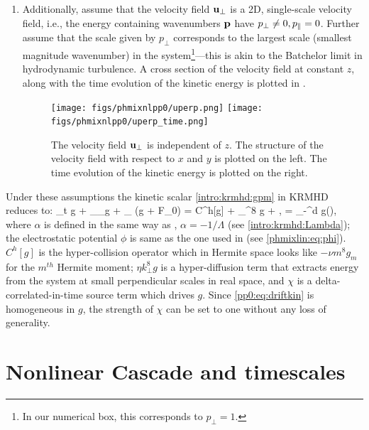 \begin{enumerate}
        \item Additionally, assume that the velocity field $\mathbf{u}_\perp$ is a 2D, single-scale velocity
        field, i.e., the energy containing wavenumbers $\mathbf{p}$ have $p_\perp\neq0,
        p_\parallel=0$.  Further assume that the scale given by $p_\perp$ corresponds to the
        largest scale (smallest magnitude wavenumber) in the system\footnote{In our
        numerical box, this corresponds to $p_\perp=1$.}---this is akin to the Batchelor limit
        \cite{batchelor59} in
        hydrodynamic turbulence. A cross section of the velocity field at constant $z$,
        along with the time evolution of the kinetic energy is plotted in
        .
    \begin{figure}
    \begin{center}
        \texttt{[image: figs/phmixnlpp0/uperp.png]}
        \texttt{[image: figs/phmixnlpp0/uperp\_time.png]}
        \caption{The velocity field $\mathbf{u}_\perp$ is independent of $z$. The structure 
        of the velocity field with respect to $x$ and $y$ is plotted on the left. The time
        evolution of the kinetic energy is plotted on the right.}
        \label{pp0:fig:uperp}
    \end{center}
    \end{figure}
    \end{enumerate}
    Under these assumptions the kinetic scalar \eqref{intro:krmhd:gpm} in KRMHD
    reduces to:
    \beq
     \partial_t g + _\perp \cdot \nabla_\perp g + \vpar \nabla_\parallel
     (g + \phi F_0) = C^h[g] + \eta \nabla_\perp^8 g + \chi, \label{pp0:eq:driftkin}
   \eeq
   \beq
     \phi  = \alpha \int_{-\infty}^\infty d \vpar g(\vpar),  \label{pp0:eq:boltz}
   \eeq
   where $\alpha$ is defined in the same way as , $\alpha = -1/\Lambda$ (see \eqref{intro:krmhd:Lambda}); 
   the electrostatic potential $\phi$ is same as the one used in  (see
   \eqref{phmixlin:eq:phi}). $C^h[g]$ is the hyper-collision operator
   which in Hermite space looks like $-\nu m^8 g_m$ for the $m^{th}$ Hermite moment; $\eta
   k_\perp^8 g$ is a hyper-diffusion term that extracts energy from the system at small perpendicular scales
   in real space, and $\chi$ is a delta-correlated-in-time source term which drives $g$.
   Since \eqref{pp0:eq:driftkin} is homogeneous in $g$, the strength of $\chi$ can be set
   to one without any loss of generality.

\section{Nonlinear Cascade and timescales}
    \label{pp0:sec:timescales}
    
